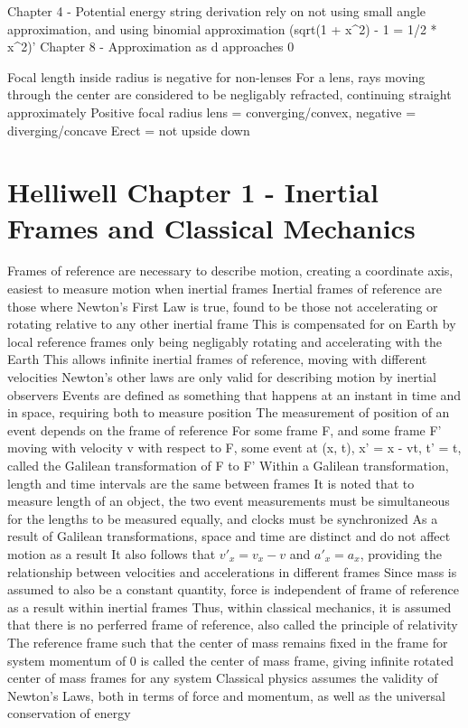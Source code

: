 \documentclass[11 pt, twoside]{article}
\newenvironment{outline*}
{
	\begin{outline}[enumerate]
	}
	{\end{outline}
}
\begin{document}
Chapter 4 - Potential energy string derivation rely on not using small angle approximation, and using binomial approximation (sqrt(1 + x^2) - 1 = 1/2 * x^2)'
Chapter 8 - Approximation as d approaches 0

Focal length inside radius is negative for non-lenses
For a lens, rays moving through the center are considered to be negligably refracted, continuing straight approximately
Positive focal radius lens = converging/convex, negative = diverging/concave
Erect = not upside down
\section{Helliwell Chapter 1 - Inertial Frames and Classical Mechanics}
\begin{outline*}
\1 Frames of reference are necessary to describe motion, creating a coordinate axis, easiest to measure motion when inertial frames
\2 Inertial frames of reference are those where Newton's First Law is true, found to be those not accelerating or rotating relative to any other inertial frame
\3 This is compensated for on Earth by local reference frames only being negligably rotating and accelerating with the Earth
\2 This allows infinite inertial frames of reference, moving with different velocities
\2 Newton's other laws are only valid for describing motion by inertial observers
\1 Events are defined as something that happens at an instant in time and in space, requiring both to measure position
\2 The measurement of position of an event depends on the frame of reference
\2 For some frame F, and some frame F' moving with velocity v with respect to F, some event at (x, t), x' = x - vt, t' = t, called the Galilean transformation of F to F'
\3 Within a Galilean transformation, length and time intervals are the same between frames
\3 It is noted that to measure length of an object, the two event measurements must be simultaneous for the lengths to be measured equally, and clocks must be synchronized
\2 As a result of Galilean transformations, space and time are distinct and do not affect motion as a result
\2 It also follows that $v'_x = v_x - v$ and $a'_x = a_x$, providing the relationship between velocities and accelerations in different frames
\3 Since mass is assumed to also be a constant quantity, force is independent of frame of reference as a result within inertial frames
\2 Thus, within classical mechanics, it is assumed that there is no perferred frame of reference, also called the principle of relativity
\1 The reference frame such that the center of mass remains fixed in the frame for system momentum of 0 is called the center of mass frame, giving infinite rotated center of mass frames for any system
\1 Classical physics assumes the validity of Newton's Laws, both in terms of force and momentum, as well as the universal conservation of energy
\end{outline*}
\end{document}
